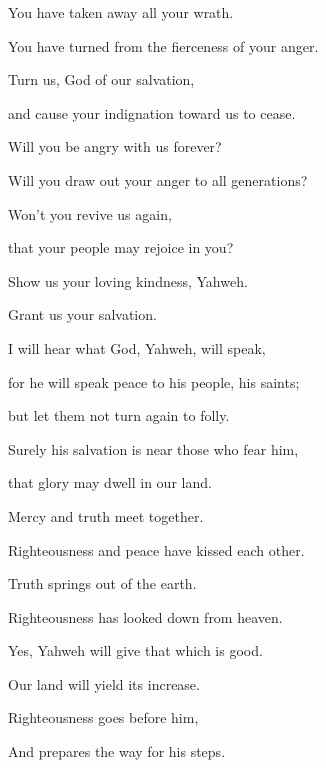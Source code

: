 {\Q {}You have taken away all your wrath.
\par }{\QB You have turned from the fierceness of your anger.
\par }{\Q {}Turn us, God of our salvation,
\par }{\QB and cause your indignation toward us to cease.
\par }{\Q {}Will you be angry with us forever?
\par }{\QB Will you draw out your anger to all generations?
\par }{\Q {}Won’t you revive us again,
\par }{\QB that your people may rejoice in you?
\par }{\Q {}Show us your loving kindness, Yahweh.
\par }{\QB Grant us your salvation.
\par }{\Q {}I will hear what God, Yahweh, will speak,
\par }{\QB for he will speak peace to his people, his saints;
\par }{\QB but let them not turn again to folly.
\par }{\Q {}Surely his salvation is near those who fear him,
\par }{\QB that glory may dwell in our land.
\par }{\Q {}Mercy and truth meet together.
\par }{\QB Righteousness and peace have kissed each other.
\par }{\Q {}Truth springs out of the earth.
\par }{\QB Righteousness has looked down from heaven.
\par }{\Q {}Yes, Yahweh will give that which is good.
\par }{\QB Our land will yield its increase.
\par }{\Q {}Righteousness goes before him,
\par }{\QB And prepares the way for his steps.

}

